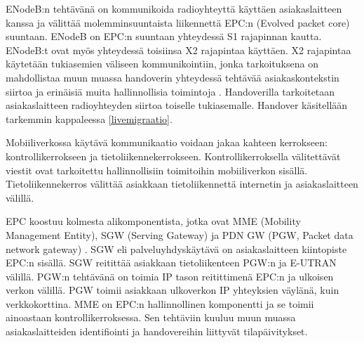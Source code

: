 ENodeB:n tehtävänä on kommunikoida radioyhteyttä käyttäen asiakaslaitteen kanssa ja välittää molemminsuuntaista liikennettä EPC:n (Evolved packet core) suuntaan. ENodeB on EPC:n suuntaan yhteydessä S1 rajapinnan kautta. ENodeB:t ovat myös yhteydessä toisiinsa X2 rajapintaa käyttäen. 
X2 rajapintaa käytetään tukiasemien väliseen kommunikointiin, jonka tarkoituksena on mahdollistaa muun muassa handoverin yhteydessä tehtävää asiakaskontekstin siirtoa ja erinäisiä muita hallinnollisia toimintoja \cite{3gpplte}.  
Handoverilla tarkoitetaan asiakaslaitteen radioyhteyden siirtoa toiselle tukiasemalle. Handover käsitellään tarkemmin kappaleessa \ref{livemigraatio}.

Mobiiliverkossa käytävä kommunikaatio voidaan jakaa kahteen kerrokseen: kontrollikerrokseen ja tietoliikennekerrokseen.
Kontrollikerroksella välitettävät viestit ovat tarkoitettu hallinnollisiin toimitoihin mobiiliverkon sisällä. 
Tietoliikennekerros välittää asiakkaan tietoliikennettä internetin ja asiakaslaitteen välillä.

EPC koostuu kolmesta alikomponentista, jotka ovat MME (Mobility Management Entity), SGW (Serving Gateway) ja PDN GW (PGW, Packet data network gateway) \cite{etsilte}.
SGW eli palveluyhdyskäytävä on asiakaslaitteen kiintopiste EPC:n sisällä.
SGW reitittää asiakkaan tietoliikenteen PGW:n ja E-UTRAN välillä. 
PGW:n tehtävänä on toimia IP tason reitittimenä EPC:n ja ulkoisen verkon välillä. 
PGW toimii asiakkaan ulkoverkon IP yhteyksien väylänä, kuin verkkokorttina. 
MME on EPC:n hallinnollinen komponentti ja se toimii ainoastaan kontrollikerroksessa. Sen tehtäviin kuuluu muun muassa asiakaslaitteiden identifiointi ja handovereihin liittyvät tilapäivitykset.
\cite{3gppepc}